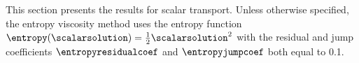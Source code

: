 This section presents the results for scalar transport. Unless otherwise
specified, the entropy viscosity method uses the entropy function
$\entropy(\scalarsolution)=\frac{1}{2}\scalarsolution^2$ with the residual
and jump coefficients $\entropyresidualcoef$ and $\entropyjumpcoef$ both
equal to 0.1.
